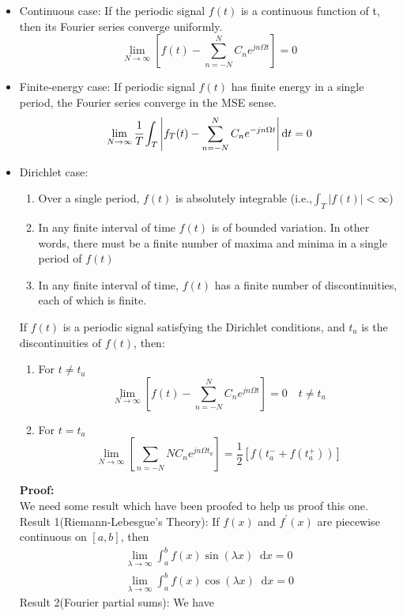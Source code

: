 \documentclass[margin,line]{res}
\newcommand*{\dif}{\mathop{}\!\mathrm{d}}
\begin{document}
\begin{resume}
\begin{itemize}
\item Continuous case: If the periodic signal $f(t)$ is a continuous function of t, then its Fourier series converge uniformly.
$$
\lim_{N \rightarrow \infty} \left[ f(t) - \sum\limits_{n=-N}^{N}{C_n e^{jn\Omega t}} \right] = 0
$$
\item Finite-energy case: If periodic signal $f(t)$ has finite energy in a single period, the Fourier series converge in the MSE sense.
$$
\lim_{N \rightarrow \infty} \cfrac{1}{T} \int_{T}\left| f_T(t) - \sum\limits_{n=-N}^{N}C_n e^{-jn\Omega t} \right| \dif t  = 0\nonumber
$$
\item Dirichlet case:
\begin{enumerate}
	\item Over a single period, $f(t)$ is absolutely integrable (i.e.,$\int_{T}\left| f(t) \right| < \infty$)
	\item In any finite interval of time $f(t)$ is of bounded variation. In other words, there must be a finite number of maxima and minima in a single period of $f(t)$
	\item In any finite interval of time, $f(t)$ has a finite number of discontinuities, each of which is finite.
\end{enumerate}
If $f(t)$ is a periodic signal satisfying the Dirichlet conditions, and $t_a$ is the discontinuities of $f(t)$, then:
\begin{enumerate}
	\item For $t \neq t_a$
	$$
	\lim_{N \rightarrow \infty} \left[ f(t) - \sum\limits_{n=-N}^{N} C_n e^{jn\Omega t} \right] = 0 \quad t \neq t_a
	$$
	\item For $t = t_a$
	$$
	\lim_{N \rightarrow \infty} \left[ \sum\limits_{n=-N}{N} C_n e^{jn\Omega t_a}\right] =
	\frac{1}{2}\left[ f(t_a^{-} + f(t_a^{+})) \right]
	$$
\end{enumerate}
\textbf{Proof:} \\
We need some result which have been proofed to help us proof this one.\\
Result 1(Riemann-Lebesgue's Theory): If $f(x)$ and $f^{'}(x)$ are piecewise continuous on $\left[ a,b \right]$, then
\begin{align}
\lim_{\lambda \rightarrow \infty} \int_{a}^{b} f(x)\sin(\lambda x) \dif x = 0 \nonumber \\
\lim_{\lambda \rightarrow \infty} \int_{a}^{b} f(x)\cos(\lambda x) \dif x = 0 \nonumber
\end{align}
Result 2(Fourier partial sums): We have 

\end{itemize}
\end{resume}
\end{document}
